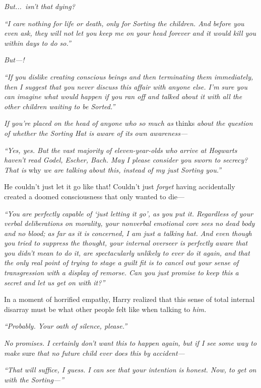 \emph{But...\ isn’t that dying?}

\emph{“I care nothing for life or death, only for Sorting the children. And before you even ask, they will not let you keep me on your head forever and it would kill you within days to do so.”}

\emph{But—!}

\emph{“If you dislike creating conscious beings and then terminating them immediately, then I suggest that you never discuss this affair with anyone else. I’m sure you can imagine what would happen if you ran off and talked about it with all the other children waiting to be Sorted.”}

\emph{If you’re placed on the head of anyone who so much as} thinks \emph{about the question of whether the Sorting Hat is aware of its own awareness—}

\emph{“Yes, yes. But the vast majority of eleven-year-olds who arrive at Hogwarts haven’t read Godel, Escher, Bach. May I please consider you sworn to secrecy? That is} why \emph{we are talking about this, instead of my just Sorting you.”}

He couldn’t just let it go like that! Couldn’t just \emph{forget} having accidentally created a doomed consciousness that only wanted to die—

\emph{“You are perfectly capable of ‘just letting it go’, as you put it. Regardless of your verbal deliberations on morality, your nonverbal emotional core sees no dead body and no blood; as far as it is concerned, I am just a talking hat. And even though you tried to suppress the thought, your internal overseer is perfectly aware that you didn’t mean to do it, are spectacularly unlikely to ever do it again, and that the only real point of trying to stage a guilt fit is to cancel out your sense of transgression with a display of remorse. Can you just promise to keep this a secret and let us get on with it?”}

In a moment of horrified empathy, Harry realized that this sense of total internal disarray must be what other people felt like when talking to \emph{him.}

\emph{“Probably. Your oath of silence, please.”}

\emph{No promises. I certainly don’t want this to happen again, but if I see some way to make} sure \emph{that no future child ever does this by accident—}

\emph{“That will suffice, I guess. I can see that your intention is honest. Now, to get on with the Sorting—”}

